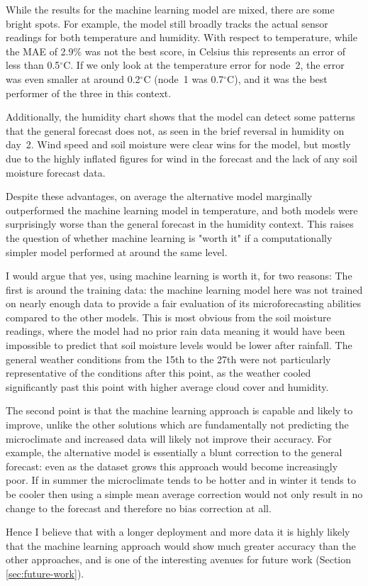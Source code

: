 While the results for the machine learning model are mixed, there are some
bright spots. For example, the model still broadly tracks the actual sensor
readings for both temperature and humidity. With respect to temperature, while
the MAE of 2.9\% was not the best score, in Celsius this represents an error of
less than 0.5$^\circ$C. If we only look at the temperature error for node~2, the
error was even smaller at around 0.2$^\circ$C (node~1 was 0.7$^\circ$C), and it
was the best performer of the three in this context.

Additionally, the humidity chart shows that the model can detect some patterns
that the general forecast does not, as seen in the brief reversal in humidity on
day~2. Wind speed and soil moisture were clear wins for the model, but mostly
due to the highly inflated figures for wind in the forecast and the lack of any
soil moisture forecast data.

Despite these advantages, on average the alternative model marginally
outperformed the machine learning model in temperature, and both models were
surprisingly worse than the general forecast in the humidity context. This
raises the question of whether machine learning is "worth it" if a
computationally simpler model performed at around the same level.

I would argue that yes, using machine learning is worth it, for two reasons: The
first is around the training data: the machine learning model here was not
trained on nearly enough data to provide a fair evaluation of its
microforecasting abilities compared to the other models. This is most obvious
from the soil moisture readings, where the model had no prior rain data meaning
it would have been impossible to predict that soil moisture levels would be
lower after rainfall. The general weather conditions from the 15th to the 27th
were not particularly representative of the conditions after this point, as the
weather cooled significantly past this point with higher average cloud cover and
humidity.

The second point is that the machine learning approach is capable and likely to
improve, unlike the other solutions which are fundamentally not predicting the
microclimate and increased data will likely not improve their accuracy. For
example, the alternative model is essentially a blunt correction to the general
forecast: even as the dataset grows this approach would become increasingly poor. If
in summer the microclimate tends to be hotter and in winter it tends to be
cooler then using a simple mean average correction would not only result in no
change to the forecast and therefore no bias correction at all.

Hence I believe that with a longer deployment and more data it is highly likely
that the machine learning approach would show much greater accuracy than the
other approaches, and is one of the interesting avenues for future work (Section
\ref{sec:future-work}).